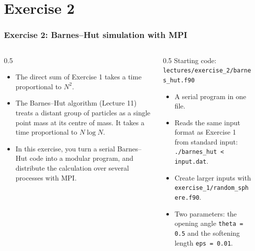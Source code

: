 
\subtitle{Course exercise 2: distributed Barnes--Hut simulation with MPI}



\begin{frame}
  \titlepage
\end{frame}

\section{Exercise 2}

\begin{frame}
  \frametitle{Exercise 2: Barnes--Hut simulation with MPI}
  \begin{columns}[T]
    \begin{column}{0.5\textwidth}
      \begin{itemize}
        \item The direct sum of Exercise 1 takes a time proportional to $N^2$.
        \item The Barnes--Hut algorithm (Lecture 11) treats a distant group of particles as a single point mass at its centre of mass. It takes a time proportional to $N \log N$.
        \item In this exercise, you turn a serial Barnes--Hut code into a modular program, and distribute the calculation over several processes with MPI.
      \end{itemize}
    \end{column}

    \begin{column}{0.5\textwidth}
      Starting code: \texttt{lectures/exercise\_2/barnes\_hut.f90}
      \begin{itemize}
        \item A serial program in one file.
        \item Reads the same input format as Exercise 1 from standard input: \mbox{\texttt{./barnes\_hut < input.dat}}.
        \item Create larger inputs with \texttt{exercise\_1/random\_sphere.f90}.
        \item Two parameters: the opening angle \mbox{\texttt{theta = 0.5}} and the softening length \mbox{\texttt{eps = 0.01}}.
      \end{itemize}
    \end{column}
  \end{columns}
\end{frame}


